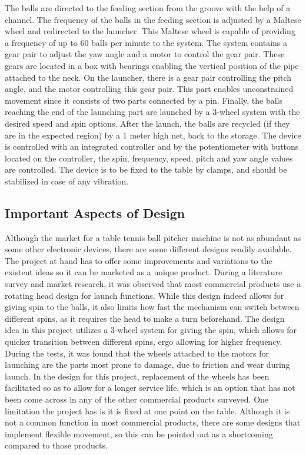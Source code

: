 \documentclass[12pt]{article}
\begin{document}
The balls are directed to the feeding section from the groove with the help of a channel. The frequency of the balls in the feeding section is adjusted by a Maltese wheel and redirected to the launcher. This Maltese wheel is capable of providing a frequency of up to 60 balls per minute to the system. The system contains a gear pair to adjust the yaw angle and a motor to control the gear pair. These gears are located in a box with bearings enabling the vertical position of the pipe attached to the neck. On the launcher, there is a gear pair controlling the pitch angle, and the motor controlling this gear pair.
This part enables unconstrained movement since it consists of two parts connected by a pin. Finally, the balls reaching the end of the launching part are launched by a 3-wheel system with the desired speed and spin options.  After the launch, the balls are recycled (if they are in the expected region) by a 1 meter high net, back to the storage.  
The device is controlled with an integrated controller and by the potentiometer with buttons located on the controller, the spin, frequency, speed, pitch and yaw angle values are controlled. The device is to be fixed to the table by clamps, and should be stabilized in case of any vibration.

\subsection{Important Aspects of Design}

Although the market for a table tennis ball pitcher machine is not as abundant as some other electronic devices, there are some different designs readily available. The project at hand has to offer some improvements and variations to the existent ideas so it can be marketed as a unique product. 
During a literature survey and market research, it was observed that most commercial products use a rotating head design for launch functions. While this design indeed allows for giving spin to the balls, it also limits how fast the mechanism can switch between different spins, as it requires the head to make a turn beforehand. The design idea in this project utilizes a 3-wheel system for giving the spin, which allows for quicker transition between different spins, ergo allowing for higher frequency.
During the tests, it was found that the wheels attached to the motors for launching are the parts most prone to damage, due to friction and wear during launch. In the design for this project, replacement of the wheels has been facilitated so as to allow for a longer service life, which is an option that has not been come across in any of the other commercial products surveyed.
One limitation the project has is it is fixed at one point on the table. Although it is not a common function in most commercial products, there are some designs that implement flexible movement, so this can be pointed out as a shortcoming compared to those products.
\end{document}
